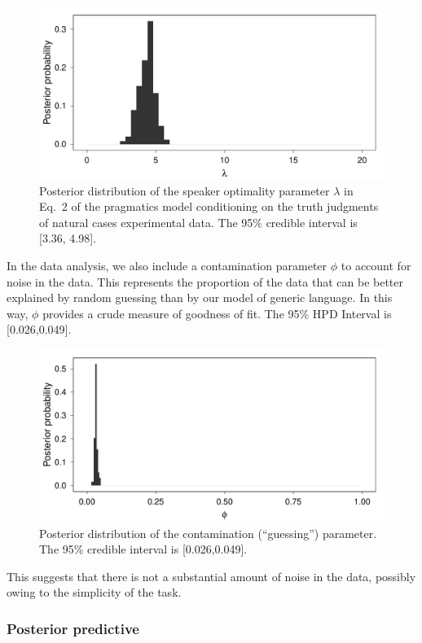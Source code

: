 \documentclass[10pt,letterpaper]{article}
\begin{document}
\begin{figure}
\centering
    \includegraphics[width=0.8\columnwidth]{naturalGenerics-speakerOptimality.pdf}
    \caption{Posterior distribution of the speaker optimality parameter $\lambda$ in Eq.~2 of the pragmatics model conditioning on the truth judgments of natural cases experimental data. The 95\% credible interval is [3.36, 4.98].}
  \label{fig:lambda1}
\end{figure}

In the data analysis, we also include a contamination parameter $\phi$ to account for noise in the data.  
This represents the proportion of the data that can be better explained by random guessing than by our model of generic language.
In this way, $\phi$ provides a crude measure of goodness of fit. 
The 95\% HPD Interval is [0.026,0.049]. 

\begin{figure}
\centering
    \includegraphics[width=0.8\columnwidth]{naturalGenerics-phi.pdf}
    \caption{Posterior distribution of the contamination (``guessing'') parameter. The 95\% credible interval is [0.026,0.049].}
  \label{fig:phi1}
\end{figure}

This suggests that there is not a substantial amount of noise in the data, possibly owing to the simplicity of the task. 


\subsubsection{Posterior predictive}
\end{document}
